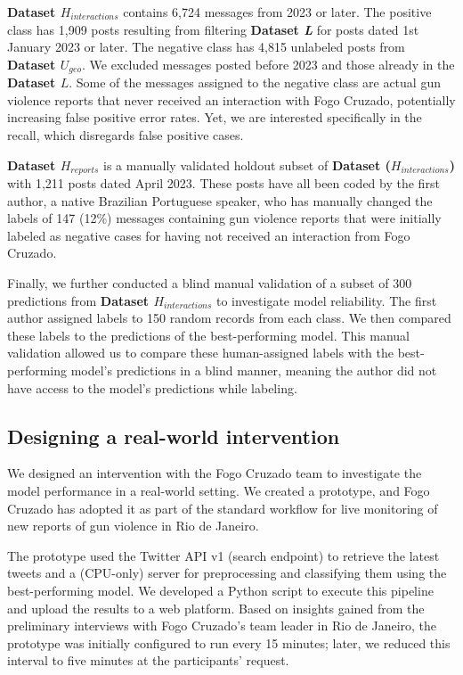 \documentclass[11pt,letterpaper]{article}
\begin{document}
\textbf{Dataset $ H_{interactions} $} contains 6,724 messages from 2023 or later. The positive class has 1,909 posts resulting from filtering \textbf{Dataset \textit{L}} for posts dated 1st January 2023 or later. The negative class has 4,815 unlabeled posts from \textbf{Dataset $ U_{geo} $}. We excluded messages posted before 2023 and those already in the \textbf{Dataset $L$}. Some of the messages assigned to the negative class are actual gun violence reports that never received an interaction with Fogo Cruzado, potentially increasing false positive error rates. Yet, we are interested specifically in the recall, which disregards false positive cases.

\textbf{Dataset $ H_{reports} $} is a manually validated holdout subset of \textbf{Dataset ($ H_{interactions} $)} with 1,211 posts dated April 2023. These posts have all been coded by the first author, a native Brazilian Portuguese speaker, who has manually changed the labels of 147 (12\%) messages containing gun violence reports that were initially labeled as negative cases for having not received an interaction from Fogo Cruzado.

Finally, we further conducted a blind manual validation of a subset of 300 predictions from \textbf{Dataset $ H_{interactions}$} to investigate model reliability. The first author assigned labels to 150 random records from each class. We then compared these labels to the predictions of the best-performing model. This manual validation allowed us to compare these human-assigned labels with the best-performing model's predictions in a blind manner, meaning the author did not have access to the model’s predictions while labeling. 

\subsection{Designing a real-world intervention}
\label{subchap:intervention}
We designed an intervention with the Fogo Cruzado team to investigate the model performance in a real-world setting. We created a prototype, and Fogo Cruzado has adopted it as part of the standard workflow for live monitoring of new reports of gun violence in Rio de Janeiro. 

The prototype used the Twitter API v1 (search endpoint) to retrieve the latest tweets and a (CPU-only) server for preprocessing and classifying them using the best-performing model. We developed a Python script to execute this pipeline and upload the results to a web platform. Based on insights gained from the preliminary interviews with Fogo Cruzado's team leader in Rio de Janeiro, the prototype was initially configured to run every 15 minutes; later, we reduced this interval to five minutes at the participants’ request.
\end{document}
